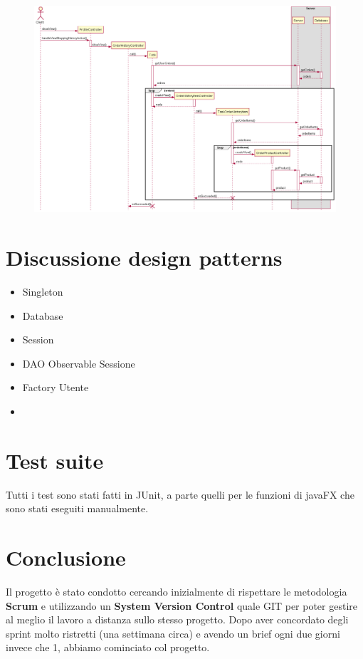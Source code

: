 \documentclass[12pt, a4paper]{article}
\begin{document}
\begin{figure}[H]
\centering
\includegraphics[width=\linewidth]{shopping_history_sequence.png}

\end{figure}


\section{Discussione design patterns}

\begin{itemize}
\item Singleton
\item Database
\item Session
\item DAO Observable Sessione
\item Factory Utente
\item 
\end{itemize}



\section{Test suite}

Tutti i test sono stati fatti in JUnit, a parte quelli per le funzioni di javaFX che sono stati eseguiti manualmente.


\section{Conclusione}
Il progetto è stato condotto cercando inizialmente di rispettare le metodologia \textbf{Scrum} e utilizzando un \textbf{System Version Control} quale GIT per poter gestire al meglio il lavoro a distanza sullo stesso progetto. Dopo aver concordato degli sprint molto ristretti (una settimana circa) e avendo un brief ogni due giorni invece che 1, abbiamo cominciato col progetto.
\end{document}
